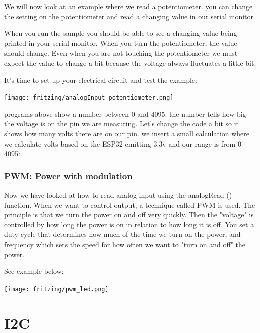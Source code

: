 \documentclass[12pt, a4paper]{article}
\begin{document}
We will now look at an example where we read a potentiometer. you can change the setting on the potentiometer and read a changing value in our serial monitor

When you run the sample you should be able to see a changing value being printed in your serial monitor. When you turn the potentiometer, the value should change. Even when you are not touching the potentiometer we must expect the value to change a bit because the voltage always fluctuates a little bit.

It's time to set up your electrical circuit and test the example:
\begin{center}
  \texttt{[image: fritzing/analogInput\_potentiometer.png]}
\end{center}



programs above show a number between 0 and 4095. the number tells how big the voltage is on the pin we are measuring. Let's change the code a bit so it shows how many volts there are on our pin. we insert a small calculation where we calculate volts based on the ESP32 emitting 3.3v and our range is from 0-4095:



\subsubsection{PWM: Power with modulation}

Now we have looked at how to read analog input using the analogRead () function. When we want to control output, a technique called PWM is used. The principle is that we turn the power on and off very quickly. Then the "voltage" is controlled by how long the power is on in relation to how long it is off.
You set a duty cycle that determines how much of the time we turn on the power, and frequency which sets the speed for how often we want to "turn on and off" the power.

See example below:
\begin{center}
  \texttt{[image: fritzing/pwm\_led.png]}
\end{center}




\section{I2C}
\end{document}
